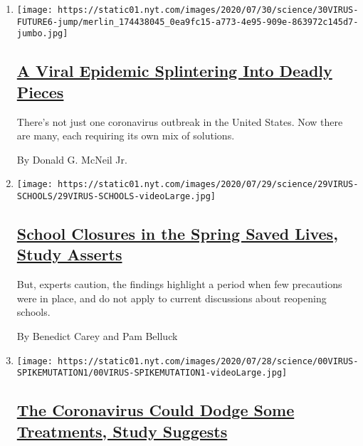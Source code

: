 \begin{enumerate}
\def\labelenumi{\arabic{enumi}.}
\item
  \texttt{[image: https://static01.nyt.com/images/2020/07/30/science/30VIRUS-FUTURE6-jump/merlin\_174438045\_0ea9fc15-a773-4e95-909e-863972c145d7-jumbo.jpg]}

  \hypertarget{a-viral-epidemic-splintering-into-deadly-pieces}{%
  \subsection{\texorpdfstring{\href{/2020/07/29/health/coronavirus-future-america.html}{A
  Viral Epidemic Splintering Into Deadly
  Pieces}}{A Viral Epidemic Splintering Into Deadly Pieces}}\label{a-viral-epidemic-splintering-into-deadly-pieces}}

  There's not just one coronavirus outbreak in the United States. Now
  there are many, each requiring its own mix of solutions.

  By Donald G. McNeil Jr.
\item
  \texttt{[image: https://static01.nyt.com/images/2020/07/29/science/29VIRUS-SCHOOLS/29VIRUS-SCHOOLS-videoLarge.jpg]}

  \hypertarget{school-closures-in-the-spring-saved-lives-study-asserts}{%
  \subsection{\texorpdfstring{\href{/2020/07/29/health/covid-school-reopening.html}{School
  Closures in the Spring Saved Lives, Study
  Asserts}}{School Closures in the Spring Saved Lives, Study Asserts}}\label{school-closures-in-the-spring-saved-lives-study-asserts}}

  But, experts caution, the findings highlight a period when few
  precautions were in place, and do not apply to current discussions
  about reopening schools.

  By Benedict Carey and Pam Belluck
\item
  \texttt{[image: https://static01.nyt.com/images/2020/07/28/science/00VIRUS-SPIKEMUTATION1/00VIRUS-SPIKEMUTATION1-videoLarge.jpg]}

  \hypertarget{the-coronavirus-could-dodge-some-treatments-study-suggests}{%
  \subsection{\texorpdfstring{\href{/2020/07/28/health/coronavirus-mutation-spike-treatment.html}{The
  Coronavirus Could Dodge Some Treatments, Study
  Suggests}}{The Coronavirus Could Dodge Some Treatments, Study Suggests}}\label{the-coronavirus-could-dodge-some-treatments-study-suggests}}


\end{enumerate}
